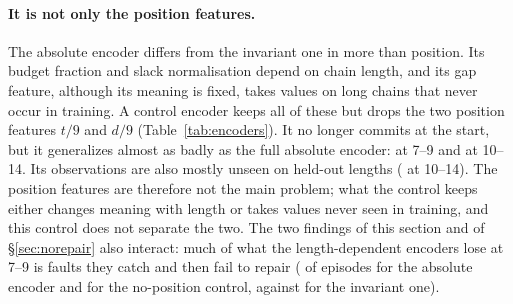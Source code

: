 \paragraph{It is not only the position features.}
The absolute encoder differs from the invariant one in more than position. Its budget fraction and slack normalisation depend on chain length, and its gap feature, although its meaning is fixed, takes values on long chains that never occur in training. A control encoder keeps all of these but drops the two position features $t/9$ and $d/9$ (Table~\ref{tab:encoders}). It no longer commits at the start, but it generalizes almost as badly as the full absolute encoder:  at 7--9 and  at 10--14. Its observations are also mostly unseen on held-out lengths ( at 10--14). The position features are therefore not the main problem; what the control keeps either changes meaning with length or takes values never seen in training, and this control does not separate the two. The two findings of this section and of \S\ref{sec:norepair} also interact: much of what the length-dependent encoders lose at 7--9 is faults they catch and then fail to repair ( of episodes for the absolute encoder and  for the no-position control, against  for the invariant one).

\begin{table}[t]
\centering
\small
\setlength{\tabcolsep}{3pt}
\caption{Encoder control (monitorability-aware reward, 10 seeds, 95\% $t$-interval). ``Unseen obs.'' is the fraction of decision points at lengths 10--14 whose observation does not occur in a reference sample from lengths 3--6, both collected from rollouts of the hand-coded policies (a property of the encoder, not of each agent's own visitation); ``commit at $t{=}0$'' is the fraction of episodes at 10--14 that commit before executing a step.}
\label{tab:encoders}
\resizebox{\linewidth}{!}{}
\end{table}

